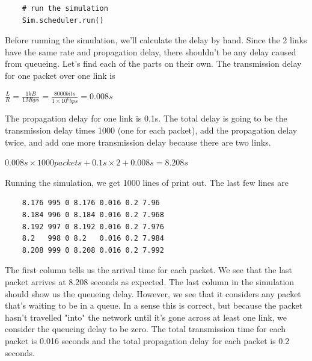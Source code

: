 \documentclass[11pt]{article}
\begin{document}
\vspace{5mm}

\begin{lstlisting}
    # run the simulation
    Sim.scheduler.run()
\end{lstlisting}

\vspace{5mm}

Before running the simulation, we'll calculate the delay by hand. Since the 2 links have the same rate and propagation delay, there shouldn't be any delay caused from queueing. Let's find each of the parts on their own. The transmission delay for one packet over one link is

\vspace{5mm}

\(\frac{L}{R} = \frac{1kB}{1Mbps} = \frac{8000bits}{1\times10^6 bps} = 0.008s\)

\vspace{5mm}

The propagation delay for one link is 0.1s. The total delay is going to be the transmission delay times 1000 (one for each packet), add the propagation delay twice, and add one more transmission delay because there are two links.

\vspace{5mm}

\(0.008s\times1000packets + 0.1s\times2 + 0.008s = 8.208s\)

\vspace{5mm}

Running the simulation, we get 1000 lines of print out. The last few lines are

\vspace{5mm}

\begin{lstlisting}
    8.176 995 0 8.176 0.016 0.2 7.96
    8.184 996 0 8.184 0.016 0.2 7.968
    8.192 997 0 8.192 0.016 0.2 7.976
    8.2   998 0 8.2   0.016 0.2 7.984
    8.208 999 0 8.208 0.016 0.2 7.992
\end{lstlisting}

\vspace{5mm}

The first column tells us the arrival time for each packet. We see that the last packet arrives at 8.208 seconds as expected. The last column in the simulation should show us the queueing delay. However, we see that it considers any packet that's waiting to be in a queue. In a sense this is correct, but because the packet hasn't travelled "into" the network until it's gone across at least one link, we consider the queueing delay to be zero. The total transmission time for each packet is 0.016 seconds and the total propagation delay for each packet is 0.2 seconds.
\end{document}
